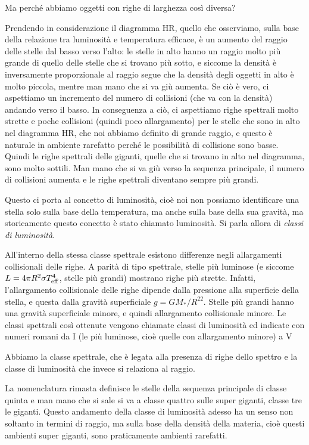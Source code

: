 Ma perché abbiamo oggetti con righe di larghezza così diversa?

Prendendo in considerazione il diagramma HR, quello che osserviamo, sulla base della relazione tra luminosità e temperatura efficace, è un aumento del raggio delle stelle dal basso verso l'alto: le stelle in alto hanno un raggio molto più grande di quello delle stelle che si trovano più sotto, e siccome la densità è inversamente proporzionale al raggio segue che la densità degli oggetti in alto è molto piccola, mentre man mano che si va giù aumenta. Se ciò è vero, ci aspettiamo un incremento del numero di collisioni (che va con la densità) andando verso il basso. In conseguenza a ciò, ci aspettiamo righe spettrali molto strette e poche collisioni (quindi poco allargamento) per le stelle che sono in alto nel diagramma HR, che noi abbiamo definito di grande raggio, e questo è naturale in ambiente rarefatto perché le possibilità di collisione sono basse. Quindi le righe spettrali delle giganti, quelle che si trovano in alto nel diagramma, sono molto sottili. Man mano che si va giù verso la sequenza principale, il numero di collisioni aumenta e le righe spettrali diventano sempre più grandi.

Questo ci porta al concetto di luminosità, cioè noi non possiamo identificare una stella solo sulla base della temperatura, ma anche sulla base della sua gravità, ma storicamente questo concetto è stato chiamato luminosità. Si parla allora di \textit{classi di luminosità}.

All'interno della stessa classe spettrale esistono differenze negli allargamenti collisionali delle righe. A parità di tipo spettrale, stelle più luminose (e siccome $L=4\pi R^2 \sigma T_{\rm eff}^4$, stelle più grandi) mostrano righe più strette. Infatti, l'allargamento collisionale delle righe dipende dalla pressione alla superficie della stella, e questa dalla gravità superficiale $g = GM_*/R^22$. Stelle più grandi hanno una gravità superficiale minore, e quindi allargamento collisionale minore. Le classi spettrali così ottenute vengono chiamate classi di luminosità ed indicate con numeri romani da I (le più luminose, cioè quelle con allargamento minore) a V

Abbiamo la classe spettrale, che è legata alla presenza di righe dello spettro e la classe di luminosità che invece si relaziona al raggio.

La nomenclatura rimasta definisce le stelle della sequenza principale di classe quinta e man mano che si sale si va a classe quattro sulle super giganti, classe tre le giganti. 
Questo andamento della classe di luminosità adesso ha un senso non soltanto in termini di raggio, ma sulla base della densità della materia, cioè questi ambienti super giganti, sono praticamente ambienti rarefatti. 

